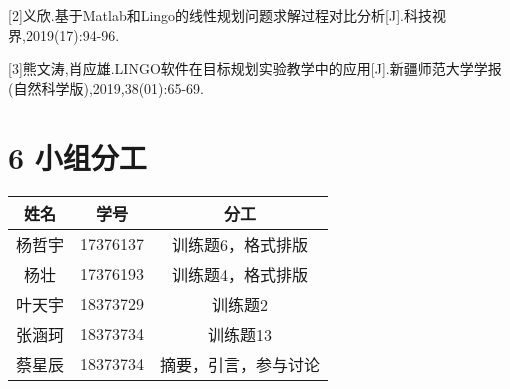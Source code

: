 \documentclass[bachelor,openany,oneside,color]{buaathesis}
\begin{document}
{[}2{]}义欣.基于Matlab和Lingo的线性规划问题求解过程对比分析{[}J{]}.科技视界,2019(17):94-96.

{[}3{]}熊文涛,肖应雄.LINGO软件在目标规划实验教学中的应用{[}J{]}.新疆师范大学学报(自然科学版),2019,38(01):65-69.

\hypertarget{header-n409}{%
\chapter{6 小组分工}\label{header-n409}}
\setcounter{table}{0}\setcounter{figure}{0}
\begin{longtable}[]{@{}ccc@{}}
\toprule
姓名 & 学号 & 分工\tabularnewline
\midrule
\endhead
杨哲宇 & 17376137 & 训练题6，格式排版\tabularnewline
杨壮 & 17376193 & 训练题4，格式排版\tabularnewline
叶天宇 & 18373729 & 训练题2\tabularnewline
张涵珂 & 18373734 & 训练题13\tabularnewline
蔡星辰 & 18373734 & 摘要，引言，参与讨论\tabularnewline
\bottomrule
\end{longtable}
\end{document}
